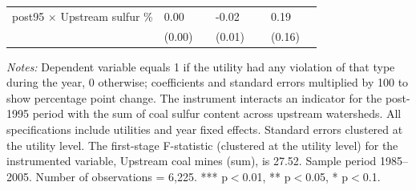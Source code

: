 \begin{table}[htbp]
{\begin{tabular}{p{5.5cm}>{\raggedleft\arraybackslash}p{3cm}>{\raggedleft\arraybackslash}p{3cm}>{\raggedleft\arraybackslash}p{3cm}}
post95 $\times$ Upstream sulfur \% & \phantom{(}\phantom{-}0.00$^{\phantom{*}\phantom{*}\phantom{*}}$ & \phantom{(}-0.02$^{\phantom{*}\phantom{*}\phantom{*}}$ & \phantom{(}\phantom{-}0.19$^{\phantom{*}\phantom{*}\phantom{*}}$ \\
 & (\phantom{-}0.00)\phantom{$^{***}$} & (\phantom{-}0.01)\phantom{$^{***}$} & (\phantom{-}0.16)\phantom{$^{***}$} \\
\bottomrule
\end{tabular}
}
\begin{minipage}{15.6247cm}
\vspace{4pt}
\footnotesize
\raggedright
\textit{Notes:} Dependent variable equals 1 if the utility had any violation of that type during the year, 0 otherwise; coefficients and standard errors multiplied by 100 to show percentage point change. The instrument interacts an indicator for the post-1995 period with the sum of coal sulfur content across upstream watersheds. All specifications include utilities and year fixed effects. Standard errors clustered at the utility level. The first-stage F-statistic (clustered at the utility level) for the instrumented variable, Upstream coal mines (sum), is 27.52. Sample period 1985--2005. Number of observations = 6,225. *** p$<$0.01, ** p$<$0.05, * p$<$0.1.
\end{minipage}
\end{table}
